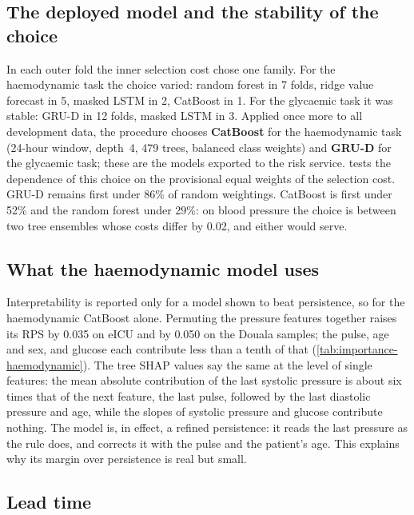 \documentclass[11pt,a4paper,oneside]{report}
\begin{document}
\subsection{The deployed model and the stability of the choice}

In each outer fold the inner selection cost chose one family. For the haemodynamic task the choice varied: random forest in 7 folds, ridge value forecast in 5, masked LSTM in 2, CatBoost in 1. For the glycaemic task it was stable: GRU-D in 12 folds, masked LSTM in 3. Applied once more to all development data, the procedure chooses \textbf{CatBoost} for the haemodynamic task (24-hour window, depth~4, 479 trees, balanced class weights) and \textbf{GRU-D} for the glycaemic task; these are the models exported to the risk service.  tests the dependence of this choice on the provisional equal weights of the selection cost. GRU-D remains first under 86\% of random weightings. CatBoost is first under 52\% and the random forest under 29\%: on blood pressure the choice is between two tree ensembles whose costs differ by 0.02, and either would serve.



\subsection{What the haemodynamic model uses}

Interpretability is reported only for a model shown to beat persistence, so for the haemodynamic CatBoost alone. Permuting the pressure features together raises its RPS by 0.035 on eICU and by 0.050 on the Douala samples; the pulse, age and sex, and glucose each contribute less than a tenth of that (\cref{tab:importance-haemodynamic}). The tree SHAP values say the same at the level of single features: the mean absolute contribution of the last systolic pressure is about six times that of the next feature, the last pulse, followed by the last diastolic pressure and age, while the slopes of systolic pressure and glucose contribute nothing. The model is, in effect, a refined persistence: it reads the last pressure as the rule does, and corrects it with the pulse and the patient's age. This explains why its margin over persistence is real but small.



\subsection{Lead time}\label{sec:results-leads}
\end{document}
